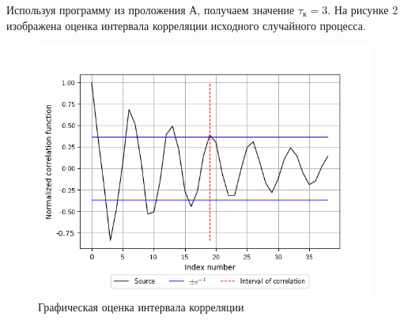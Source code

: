 \documentclass[12pt, fleqn]{article}
\begin{document}
{\begin{enumerate}
{		      	Используя программу из проложения А, получаем значение $ \tau_\text{к}  = 3 $. На рисунке 2 изображена оценка интервала корреляции исходного случайного процесса.
		      	\begin{figure}[H]
		      		\includegraphics{plot2.png}
		      		\caption{Графическая оценка интервала корреляции}
		      	\end{figure}
		      }
	\end{enumerate}
}
  

\newpage
\end{document}
